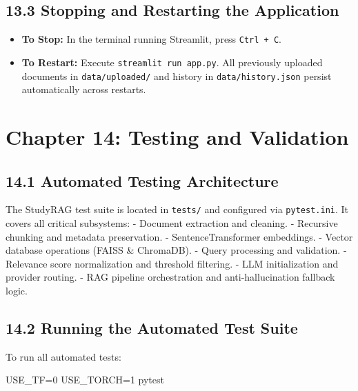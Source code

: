 \documentclass[
]{article}
\newenvironment{Shaded}{}{}
\newcommand{\ExtensionTok}[1]{#1}
\newcommand{\NormalTok}[1]{#1}
\newcommand{\OperatorTok}[1]{\textcolor[rgb]{0.40,0.40,0.40}{#1}}
\newcommand{\VariableTok}[1]{\textcolor[rgb]{0.10,0.09,0.49}{#1}}
\providecommand{\tightlist}{%
  \setlength{\itemsep}{0pt}\setlength{\parskip}{0pt}}
\begin{document}
\subsection{13.3 Stopping and Restarting the
Application}\label{stopping-and-restarting-the-application}

\begin{itemize}
\tightlist
\item
  \textbf{To Stop:} In the terminal running Streamlit, press
  \texttt{Ctrl\ \allowbreak +\ \allowbreak C}.
\item
  \textbf{To Restart:} Execute \texttt{streamlit\ \allowbreak run\ \allowbreak app.\allowbreak py}. All
  previously uploaded documents in \texttt{data/\allowbreak uploaded/\allowbreak } and history
  in \texttt{data/\allowbreak history.\allowbreak json} persist automatically across restarts.
\end{itemize}

\section{Chapter 14: Testing and
Validation}\label{chapter-14-testing-and-validation}

\subsection{14.1 Automated Testing
Architecture}\label{automated-testing-architecture}

The StudyRAG test suite is located in \texttt{tests/\allowbreak } and configured via
\texttt{pytest.\allowbreak ini}. It covers all critical subsystems: - Document
extraction and cleaning. - Recursive chunking and metadata preservation.
- SentenceTransformer embeddings. - Vector database operations (FAISS \&
ChromaDB). - Query processing and validation. - Relevance score
normalization and threshold filtering. - LLM initialization and provider
routing. - RAG pipeline orchestration and anti-hallucination fallback
logic.

\subsection{14.2 Running the Automated Test
Suite}\label{running-the-automated-test-suite}

To run all automated tests:

\begin{Shaded}
\begin{Highlighting}[]
\VariableTok{USE\_TF}\OperatorTok{=}\NormalTok{0 }\VariableTok{USE\_TORCH}\OperatorTok{=}\NormalTok{1 }\ExtensionTok{pytest}
\end{Highlighting}
\end{Shaded}
\end{document}
